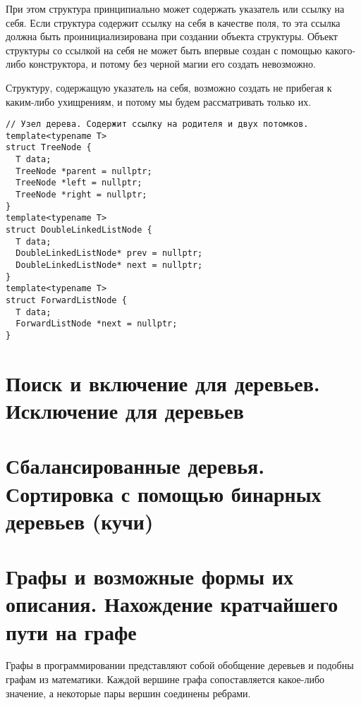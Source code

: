 При этом структура принципиально может содержать указатель или ссылку на себя. Если структура содержит ссылку на себя
в качестве поля, то эта ссылка должна быть проинициализирована при создании объекта структуры. Объект структуры со
ссылкой на себя не может быть впервые создан с помощью какого-либо конструктора, и потому без черной магии его
создать невозможно.

Структуру, содержащую указатель на себя, возможно создать не прибегая к каким-либо ухищрениям,
и потому мы будем рассматривать только их.

\begin{verbatim}
// Узел дерева. Содержит ссылку на родителя и двух потомков.
template<typename T>
struct TreeNode {
  T data;
  TreeNode *parent = nullptr;
  TreeNode *left = nullptr;
  TreeNode *right = nullptr;
}
template<typename T>
struct DoubleLinkedListNode {
  T data;
  DoubleLinkedListNode* prev = nullptr;
  DoubleLinkedListNode* next = nullptr;
}
template<typename T>
struct ForwardListNode {
  T data;
  ForwardListNode *next = nullptr;
}
\end{verbatim}

\section{Поиск и включение для деревьев. Исключение для деревьев}
\label{sec:tree-node-ops}
\section{Сбалансированные деревья. Сортировка с помощью бинарных деревьев (кучи)}
\section{Графы и возможные формы их описания. Нахождение кратчайшего пути на графе}
Графы в программировании представляют собой обобщение деревьев и подобны графам из математики.
Каждой вершине графа сопоставляется какое-либо значение, а некоторые пары вершин соединены
ребрами.

